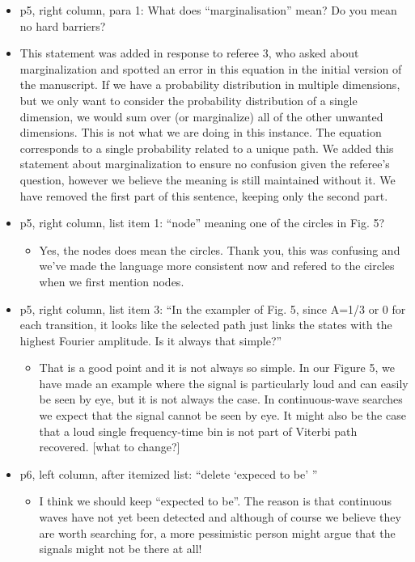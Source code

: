 \documentclass[a4paper, 10pt]{letter}
\begin{document}
\begin{itemize}
\item p5, right column, para 1: What does ``marginalisation'' mean? Do you mean no hard barriers?
\item This statement was added in response to referee 3, who asked about marginalization and spotted an error in this equation in the initial version of the manuscript. If we have a probability distribution in multiple dimensions, but we only want to consider the probability distribution of a single dimension, we would sum over (or marginalize) all of the other unwanted dimensions. This is not what we are doing in this instance. The equation corresponds to a single probability related to a unique path. We added this statement about marginalization to ensure no confusion given the referee's question, however we believe the meaning is still maintained without it. We have removed the first part of this sentence, keeping only the second part. 

\item p5, right column, list item 1: ``node'' meaning one of the circles in Fig. 5? 
\begin{itemize}
\item Yes, the nodes does mean the circles. Thank you, this was confusing and we've made the language more consistent now and refered to the circles when we first mention nodes.
\end{itemize}

\item p5, right column, list item 3: ``In the exampler of Fig. 5, since A=1/3 or 0 for each transition, it looks like the selected path just links the states with the highest Fourier amplitude. Is it always that simple?''
\begin{itemize}
\item That is a good point and it is not always so simple. In our Figure 5, we have made an example where the signal is particularly loud and can easily be seen by eye, but it is not always the case. In continuous-wave searches we expect that the signal cannot be seen by eye. It might also be the case that a loud single frequency-time bin is not part of Viterbi path recovered. [what to change?]
\end{itemize}

\item p6, left column, after itemized list: ``delete `expeced to be' ''
\begin{itemize}
\item I think we should keep ``expected to be''. The reason is that continuous waves have not yet been detected and although of course we believe they are worth searching for, a more pessimistic person might argue that the signals might not be there at all! 
\end{itemize}


\end{itemize}
\end{document}

